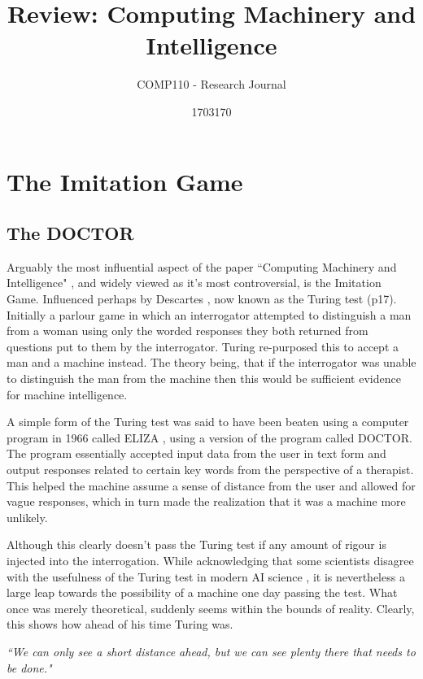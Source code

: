 \documentclass{scrartcl}
\title{Review: Computing Machinery and Intelligence
}
\subtitle{COMP110 - Research Journal}
\author{1703170}
\begin{document}
\maketitle

\section{The Imitation Game}

\subsection{The DOCTOR}

Arguably the most influential aspect of the paper \textquotedblleft Computing Machinery and Intelligence" \cite{turing1950computing:1}, and widely viewed as it's most controversial, is the Imitation Game. Influenced perhaps by Descartes \cite{descartes1996discourse:2}, now known as the Turing test \cite{suchman1987plans:3} (p17). Initially a parlour game in which an interrogator attempted to distinguish a man from a woman using only the worded responses they both returned from questions put to them by the interrogator. Turing re-purposed this to accept a man and a machine instead. The theory being, that if the interrogator was unable to distinguish the man from the machine then this would be sufficient evidence for machine intelligence.

A simple form of the Turing test was said to have been beaten using a computer program in 1966 called ELIZA \cite{weizenbaum1966eliza:4}, using a version of the program called DOCTOR. The program essentially accepted input data from the user in text form and output responses related to certain key words from the perspective of a therapist. This helped the machine assume a sense of distance from the user and allowed for vague responses, which in turn made the realization that it was a machine more unlikely.

Although this clearly doesn't pass the Turing test if any amount of rigour is injected into the interrogation. While acknowledging that some scientists disagree with the usefulness of the Turing test in modern AI science \cite{hayes1995turing:5}, it is nevertheless a large leap towards the possibility of a machine one day passing the test. What once was merely theoretical, suddenly seems within the bounds of reality. Clearly, this shows how ahead of his time Turing was.

\textit{\textquotedblleft We can only see a short distance ahead, but we can see plenty there that needs to be done."} 
\end{document}
